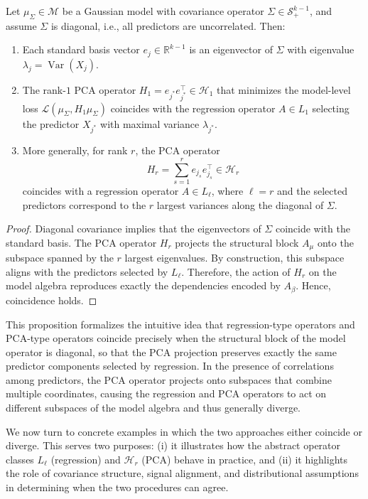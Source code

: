 \begin{prop}
Let $\mu_\Sigma \in \mathcal{M}$ be a Gaussian model with covariance operator $\Sigma \in \mathcal{S}_{+}^{k-1}$, and assume $\Sigma$ is diagonal, i.e., all predictors are uncorrelated. Then:
\begin{enumerate}
    \item Each standard basis vector $e_j \in \mathbb{R}^{k-1}$ is an eigenvector of $\Sigma$ with eigenvalue $\lambda_j = \operatorname{Var}(X_j)$.
    \item The rank-$1$ PCA operator $H_1 = e_{j^*} e_{j^*}^\top \in \mathcal{H}_1$ that minimizes the model-level loss $\mathcal{L}(\mu_\Sigma, H_1 \mu_\Sigma)$ coincides with the regression operator $A \in L_1$ selecting the predictor $X_{j^*}$ with maximal variance $\lambda_{j^*}$.
    \item More generally, for rank $r$, the PCA operator
    \[
        H_r = \sum_{s=1}^r e_{j_s} e_{j_s}^\top \in \mathcal{H}_r
    \]
    coincides with a regression operator $A \in L_\ell$, where $\ell = r$ and the selected predictors correspond to the $r$ largest variances along the diagonal of $\Sigma$.
\end{enumerate}
\end{prop}

\begin{proof}
Diagonal covariance implies that the eigenvectors of $\Sigma$ coincide with the standard basis.  
The PCA operator $H_r$ projects the structural block $A_\mu$ onto the subspace spanned by the $r$ largest eigenvalues. By construction, this subspace aligns with the predictors selected by $L_\ell$. Therefore, the action of $H_r$ on the model algebra reproduces exactly the dependencies encoded by $A_\beta$. Hence, coincidence holds.
\end{proof}

This proposition formalizes the intuitive idea that regression-type operators and PCA-type operators coincide precisely when the structural block of the model operator is diagonal, so that the PCA projection preserves exactly the same predictor components selected by regression. In the presence of correlations among predictors, the PCA operator projects onto subspaces that combine multiple coordinates, causing the regression and PCA operators to act on different subspaces of the model algebra and thus generally diverge.

We now turn to concrete examples in which the two approaches either coincide or diverge. This serves two purposes: (i) it illustrates how the abstract operator classes $L_\ell$ (regression) and $\mathcal{H}_r$ (PCA) behave in practice, and (ii) it highlights the role of covariance structure, signal alignment, and distributional assumptions in determining when the two procedures can agree.

